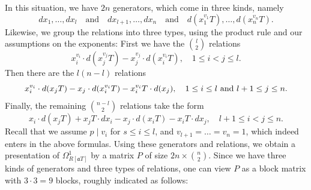 \documentclass[oneside, 12pt]{amsart}
\theoremstyle{definition}
\theoremstyle{remark}
\newcommand{\ideala}{\mathfrak{a}}
\newcommand{\quadand}{\quad\text{and}\quad}
\begin{document}
In this situation, we have   $2n$ generators, which  come in three kinds, namely 
$$
dx_1 ,\ldots,dx_l\quadand  dx_{l+1} ,\ldots,dx_n\quadand d(x_1^{v_1}T),\ldots,d(x_n^{v_n}T).
$$
Likewise, we group the relations into three types, using the product rule and our assumptions on the exponents:  First we have  the $\binom{l}{2}$
relations  
\begin{equation}
\label{minors I}
x_i^{v_i}\cdot d(x_j^{v_j}T) - x_j^{v_j}\cdot d(x_i^{v_i}T),\quad 1\leq i<j\leq l.
\end{equation}
Then there are the  $l(n-l)$ relations
\begin{equation}
\label{minors II}
x_i^{v_i}\cdot d(x_jT) - x_j\cdot d(x_i^{v_i}T) - x_i^{v_i}T\cdot d(x_j),\quad \text{$1\leq i\leq l$ and $ l+1\leq j\leq n$}.  
\end{equation}
Finally,  the remaining $\binom{n-l}{2}$ relations take the form
\begin{equation}
\label{minors III}
x_i\cdot d(x_jT)+ x_jT\cdot dx_i - x_j\cdot d(x_iT) - x_iT\cdot dx_j,\quad l+1\leq i<j\leq n.
\end{equation}
Recall that we assume $p\mid v_i$ for $s\leq i\leq l$, and $v_{l+1}=\ldots=v_n=1$, which indeed enters in the above formulas.
Using these generators and relations, we obtain a presentation of $\Omega^1_{R[\ideala T]}$ by a matrix $P$
of size $2n\times\binom{n}{2}$. Since we have three kinds of generators and three types of relations, one can view
$P$ as a block matrix with $3\cdot 3=9$ blocks,  roughly indicated as follows:
\newcommand{\+}{\phantom{+}}
\end{document}
